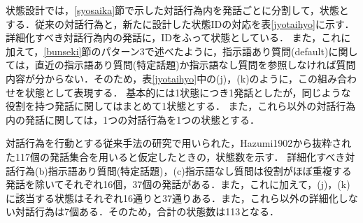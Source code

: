 \documentclass[12pt,a4paper,twoside,openany]{jbook}
\begin{document}
状態設計では，\ref{syosaika}節で示した対話行為内を発話ごとに分割して，状態とする．従来の対話行為と，新たに設計した状態IDの対応を表\ref{jyotaihyo}に示す．
詳細化すべき対話行為内の発話に，IDをふって状態としている．
また，これに加えて，\ref{bunseki}節のパターン3で述べたように，指示語あり質問(default)に関しては，直近の指示語あり質問(特定話題)か指示語なし質問を参照しなければ質問内容が分からない．そのため，表\ref{jyotaihyo}中の(j)，(k)のように，この組み合わせを状態として表現する．
基本的には1状態につき1発話としたが，同じような役割を持つ発話に関してはまとめて1状態とする．
また，これら以外の対話行為内の発話に関しては，1つの対話行為を1つの状態とする．

対話行為を行動とする従来手法の研究\cite{nishimoto2}で用いられた，Hazumi1902\cite{hazumi}から抜粋された117個の発話集合を用いると仮定したときの，状態数を示す．
詳細化すべき対話行為(b)指示語あり質問(特定話題)，(c)指示語なし質問は役割がほぼ重複する発話を除いてそれぞれ16個，37個の発話がある．また，これに加えて，(j)，(k)に該当する状態はそれぞれ16通りと37通りある．また，これら以外の詳細化しない対話行為は7個ある．そのため，合計の状態数は113となる．

\end{document}
